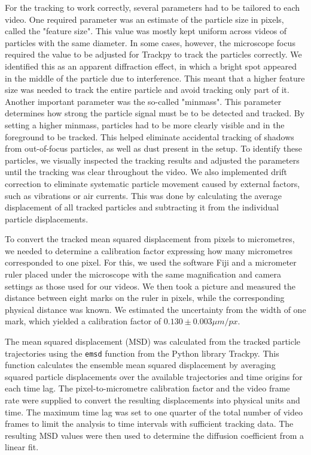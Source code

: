 \documentclass[twocolumn,a4paper,aps,amsmath,amssymb,floatfix,superscriptaddress]{revtex4-2}
\begin{document}
    For the tracking to work correctly, several parameters had to be tailored to each video. One required parameter was an estimate of the particle size in pixels, called the "feature size". This value was mostly kept uniform across videos of particles with the same diameter. In some cases, however, the microscope focus required the value to be adjusted for Trackpy to track the particles correctly. We identified this as an apparent diffraction effect, in which a bright spot appeared in the middle of the particle due to interference. This meant that a higher feature size was needed to track the entire particle and avoid tracking only part of it. Another important parameter was the so-called "minmass". This parameter determines how strong the particle signal must be to be detected and tracked. By setting a higher minmass, particles had to be more clearly visible and in the foreground to be tracked. This helped eliminate accidental tracking of shadows from out-of-focus particles, as well as dust present in the setup. To identify these particles, we visually inspected the tracking results and adjusted the parameters until the tracking was clear throughout the video. We also implemented drift correction to eliminate systematic particle movement caused by external factors, such as vibrations or air currents. This was done by calculating the average displacement of all tracked particles and subtracting it from the individual particle displacements.

    To convert the tracked mean squared displacement from pixels to micrometres, we needed to determine a calibration factor expressing how many micrometres corresponded to one pixel. For this, we used the software Fiji and a micrometer ruler placed under the microscope with the same magnification and camera settings as those used for our videos. We then took a picture and measured the distance between eight marks on the ruler in pixels, while the corresponding physical distance was known. We estimated the uncertainty from the width of one mark, which yielded a calibration factor of $0.130 \pm 0.003 \mu m/px$.

    The mean squared displacement (MSD) was calculated from the tracked particle trajectories using the \texttt{emsd} function from the Python library Trackpy. This function calculates the ensemble mean squared displacement by averaging squared particle displacements over the available trajectories and time origins for each time lag. The pixel-to-micrometre calibration factor and the video frame rate were supplied to convert the resulting displacements into physical units and time. The maximum time lag was set to one quarter of the total number of video frames to limit the analysis to time intervals with sufficient tracking data. The resulting MSD values were then used to determine the diffusion coefficient from a linear fit.
\end{document}
